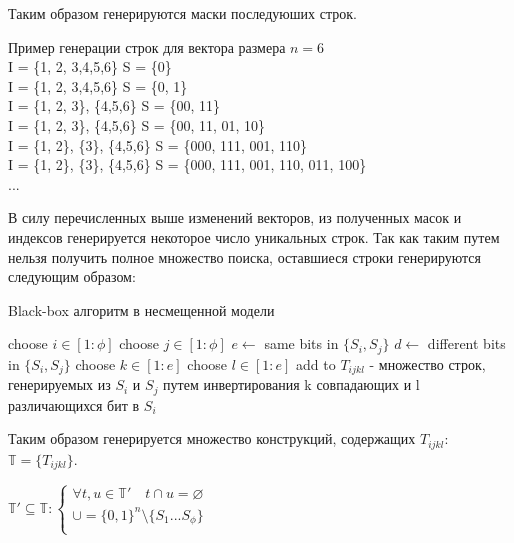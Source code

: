 Таким образом генерируются маски последуюших строк. 

\begin{example}
Пример генерации строк для вектора размера $n = 6$ \\
    I = \{1, 2, 3,4,5,6\} \:\: S = \{0\} \\
    I = \{1, 2, 3,4,5,6\}  \:\: S = \{0, 1\} \\
    I = \{1, 2, 3\}, \{4,5,6\} \:\: S = \{00, 11\} \\
    I = \{1, 2, 3\}, \{4,5,6\} \:\: S = \{00, 11, 01, 10\} \\
    I = \{1, 2\}, \{3\}, \{4,5,6\} \:\: S = \{000, 111, 001, 110\} \\
    I = \{1, 2\}, \{3\}, \{4,5,6\} \:\: S = \{000, 111, 001, 110, 011, 100\} \\
    ...
\end{example}

В силу перечисленных выше изменений векторов, из полученных масок и индексов генерируется некоторое число уникальных строк. 
Так как таким путем нельзя получить полное множество поиска, оставшиеся строки генерируются следующим образом:  

\begin{algorithm}[!h]
\caption{Black-box алгоритм в несмещенной модели}\label{lst1}
\begin{algorithmic}
	    \State choose $i \in [1 : \phi] $
	    \State choose $j \in [1 : \phi] $
	    \State $e \leftarrow$ same bits in $\{S_i, S_j\}$
	    \State $d \leftarrow$ different bits in $\{S_i, S_j\}$
	    \State choose $k \in [1 : e] $
	    \State choose $l \in [1 : e] $
	    \State add to $T_{ijkl}$ - множество строк, генерируемых из $S_i$ и $S_j$ путем инвертирования k совпадающих и l различающихся бит в $S_i$
		\EndFor
\end{algorithmic}
\end{algorithm}

Таким образом генерируется множество конструкций, содержащих $T_{ijkl}$:   $\mathbb{T} = \{ T_{ijkl} \}$.
    
    \begin{math}
        \mathbb{T'} \subseteq \mathbb{T} : 
                   \left\{  
           \begin{array}{rcl}  
            \forall t, u \in \mathbb{T'} \quad t \cap u = \varnothing \\  
              \cup = {\{0, 1 \}}^n \setminus \{S_1...S_{\phi}\} \\  
           \end{array}   
           \right.
    \end{math}


